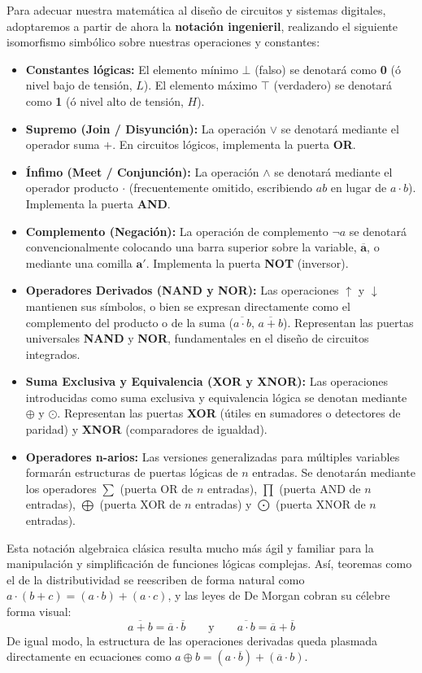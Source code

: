 Para adecuar nuestra matemática al diseño de circuitos y sistemas digitales, adoptaremos a partir de ahora la \textbf{notación ingenieril}, realizando el siguiente isomorfismo simbólico sobre nuestras operaciones y constantes:
\begin{itemize}
    \item \textbf{Constantes lógicas:} El elemento mínimo $\bot$ (falso) se denotará como \textbf{0} (ó nivel bajo de tensión, $L$). El elemento máximo $\top$ (verdadero) se denotará como \textbf{1} (ó nivel alto de tensión, $H$).
    \item \textbf{Supremo (Join / Disyunción):} La operación $\vee$ se denotará mediante el operador suma $\mathbf{+}$. En circuitos lógicos, implementa la puerta \textbf{OR}.
    \item \textbf{Ínfimo (Meet / Conjunción):} La operación $\wedge$ se denotará mediante el operador producto $\mathbf{\cdot}$ (frecuentemente omitido, escribiendo $ab$ en lugar de $a \cdot b$). Implementa la puerta \textbf{AND}.
    \item \textbf{Complemento (Negación):} La operación de complemento $\neg a$ se denotará convencionalmente colocando una barra superior sobre la variable, $\mathbf{\overline{a}}$, o mediante una comilla $\mathbf{a'}$. Implementa la puerta \textbf{NOT} (inversor).
    \item \textbf{Operadores Derivados (NAND y NOR):} Las operaciones $\uparrow$ y $\downarrow$ mantienen sus símbolos, o bien se expresan directamente como el complemento del producto o de la suma ($\overline{a \cdot b}$, $\overline{a+b}$). Representan las puertas universales \textbf{NAND} y \textbf{NOR}, fundamentales en el diseño de circuitos integrados.
    \item \textbf{Suma Exclusiva y Equivalencia (XOR y XNOR):} Las operaciones introducidas como suma exclusiva y equivalencia lógica se denotan mediante $\mathbf{\oplus}$ y $\mathbf{\odot}$. Representan las puertas \textbf{XOR} (útiles en sumadores o detectores de paridad) y \textbf{XNOR} (comparadores de igualdad).
    \item \textbf{Operadores n-arios:} Las versiones generalizadas para múltiples variables formarán estructuras de puertas lógicas de $n$ entradas. Se denotarán mediante los operadores $\sum$ (puerta OR de $n$ entradas), $\prod$ (puerta AND de $n$ entradas), $\bigoplus$ (puerta XOR de $n$ entradas) y $\bigodot$ (puerta XNOR de $n$ entradas).
\end{itemize}

Esta notación algebraica clásica resulta mucho más ágil y familiar para la manipulación y simplificación de funciones lógicas complejas. Así, teoremas como el de la distributividad se reescriben de forma natural como $a \cdot (b + c) = (a \cdot b) + (a \cdot c)$, y las leyes de De Morgan cobran su célebre forma visual:
\[ \overline{a + b} = \overline{a} \cdot \overline{b} \qquad \text{y} \qquad \overline{a \cdot b} = \overline{a} + \overline{b} \]
De igual modo, la estructura de las operaciones derivadas queda plasmada directamente en ecuaciones como $a \oplus b = (a \cdot \overline{b}) + (\overline{a} \cdot b)$.

